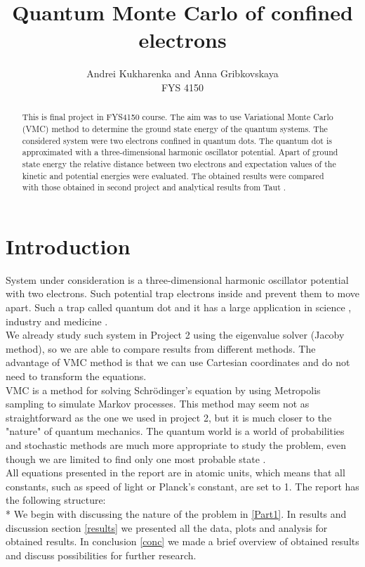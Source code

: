 \documentclass[10pt]{article}
\begin{document}
\setlength\parindent{1pt}
\title{Quantum Monte Carlo of confined electrons }
\author{Andrei Kukharenka and Anna Gribkovskaya \\  
FYS 4150 
}

\maketitle
\begin{abstract}
This is final project in FYS4150 course. The aim was to use Variational Monte Carlo (VMC) method to determine the ground state energy of the quantum systems. The considered system were two electrons confined in quantum dots. The quantum dot is approximated with a three-dimensional harmonic oscillator potential. Apart of ground state energy the relative distance between two electrons and expectation values of the kinetic and potential energies were evaluated. The obtained results were compared with those obtained in second project and analytical results from Taut \cite{three}. 
\end{abstract}
\clearpage 


\section{Introduction}
System under consideration is a three-dimensional harmonic oscillator potential with two electrons. Such potential trap electrons inside and prevent them to move apart. Such a trap called quantum dot and it has a large application in science \cite{four}, industry\cite{five} and medicine \cite{med}. \\
We already study such system in Project 2 using the eigenvalue solver (Jacoby method), so we are able to compare results from different methods. The advantage of VMC method is that we can use Cartesian coordinates and do not need to transform the equations. \\ 
VMC is a method for solving Schr\"{o}dinger's equation by using Metropolis sampling to simulate Markov processes. This method may seem not as straightforward as the one we used in project 2, but it is much closer to the "nature" of quantum mechanics. The quantum world is a world of probabilities and stochastic methods are much more appropriate to study the problem, even though we are limited to find only one most probable state \cite{one}. \\
All equations presented in the report are in atomic units, which means that all constants, such as speed of light or Planck's constant, are set to 1.
The report has the following structure:\\*
We begin with discussing the nature of the problem in \ref{Part1}.
In results and discussion section \ref{results} we presented all the data, plots and analysis for obtained results. 
In conclusion \ref{conc} we made a brief overview of obtained results and discuss possibilities for further research. 
\end{document}
